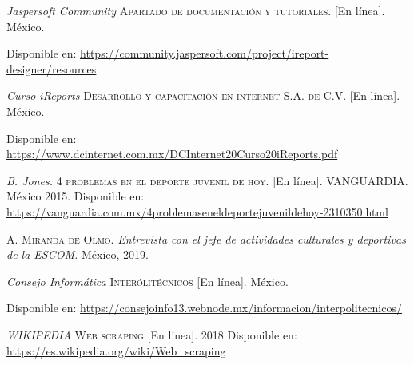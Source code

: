 \begin{thebibliography}{}
	
	\textit{Jaspersoft Community}
	\textsc{Apartado de documentación y tutoriales.} [En línea]. México.
	
	Disponible en: 
	\url{https://community.jaspersoft.com/project/ireport-designer/resources}	
	
	
	\textit{Curso iReports}
	\textsc{Desarrollo y capacitación en internet S.A. de C.V.} [En línea]. México.
	
	Disponible en: 
	\url{https://www.dcinternet.com.mx/DCInternet20Curso20iReports.pdf}	
	
	\textit{B. Jones.}
	\textsc{4 problemas en el deporte juvenil de hoy.} [En línea].
	VANGUARDIA. México 2015.
	Disponible en: 
	\url{https://vanguardia.com.mx/4problemaseneldeportejuvenildehoy-2310350.html}
	
	
	\textsc{A. Miranda de Olmo.}
	\textit{Entrevista con el jefe de actividades culturales y deportivas de la ESCOM.} México, 2019.
	
	
	\textit{Consejo Informática}
	\textsc{Interólitécnicos} [En línea]. México.
	
	Disponible en: 
	\url{https://consejoinfo13.webnode.mx/informacion/interpolitecnicos/}
	
	\textit{WIKIPEDIA}
	\textsc{Web scraping} 
	[En linea]. 2018
	Disponible en:
	\url{https://es.wikipedia.org/wiki/Web_scraping}     
\end{thebibliography}
